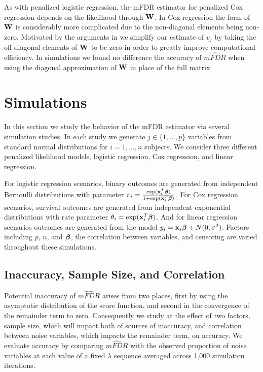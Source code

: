 As with penalized logistic regression, the mFDR estimator for penalized Cox regression depends on the likelihood through $\mathbf{W}$. In Cox regression the form of $\mathbf{W}$ is considerably more complicated due to the non-diagonal elements being non-zero. Motivated by the arguments in \citet{Simon_COXPH_CD} we simplify our estimate of $v_j$ by taking the off-diagonal elements of $\mathbf{W}$ to be zero in order to greatly improve computational efficiency. In simulations we found no difference the accuracy of $\widehat{mFDR}$ when using the diagonal approximation of $\mathbf{W}$ in place of the full matrix.

\section{Simulations}

In this section we study the behavior of the mFDR estimator via several simulation studies. In each study we generate $j \in \{1, \ldots, p\}$ variables from standard normal distributions for $i = 1, \ldots, n$ subjects. We consider three different penalized likelihood models, logistic regression, Cox regression, and linear regression.

For logistic regression scenarios, binary outcomes are generated from independent Bernoulli distributions with parameter $\pi_i = \frac{\exp(\mathbf{x}_i^T \boldsymbol{\beta})} {1 + \exp(\mathbf{x}_i^T \boldsymbol{\beta})}$. For Cox regression scenarios, survival outcomes are generated from independent exponential distributions with rate parameter $\theta_i = \exp(\mathbf{x}_i^T \boldsymbol{\beta})$. And for linear regression scenarios outcomes are generated from the model $y_i = \mathbf{x}_i\boldsymbol{\beta} + N(0,\sigma^2)$. Factors including $p$, $n$, and $\boldsymbol{\beta}$, the correlation between variables, and censoring are varied throughout these simulations.

\subsection{Inaccuracy, Sample Size, and Correlation}

Potential inaccuracy of $\widehat{mFDR}$ arises from two places, first by using the asymptotic distribution of the score function, and second in the convergence of the remainder term to zero. Consequently we study at the effect of two factors, sample size, which will impact both of sources of inaccuracy, and correlation between noise variables, which impacts the remainder term, on accuracy. We evaluate accuracy by comparing $\widehat{mFDR}$ with the observed proportion of noise variables at each value of a fixed $\lambda$ sequence averaged across 1,000 simulation iterations.

